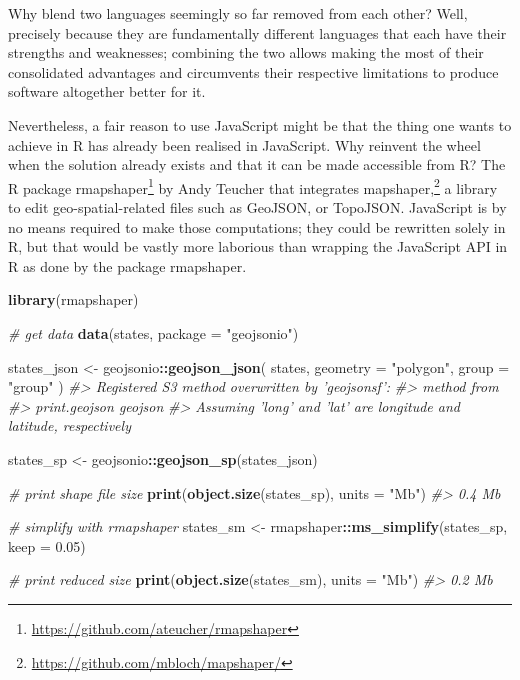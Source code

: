 \documentclass[10pt,]{krantz}
\makeatletter
\newenvironment{Shaded}{\begin{snugshade}}{\end{snugshade}}
\newcommand{\CommentTok}[1]{\textcolor[rgb]{0.37,0.37,0.37}{\textit{#1}}}
\newcommand{\DataTypeTok}[1]{\textcolor[rgb]{0.27,0.27,0.27}{#1}}
\newcommand{\FloatTok}[1]{\textcolor[rgb]{0.06,0.06,0.06}{#1}}
\newcommand{\KeywordTok}[1]{\textcolor[rgb]{0.27,0.27,0.27}{\textbf{#1}}}
\newcommand{\NormalTok}[1]{#1}
\newcommand{\OperatorTok}[1]{\textcolor[rgb]{0.43,0.43,0.43}{\textbf{#1}}}
\newcommand{\StringTok}[1]{\textcolor[rgb]{0.5,0.5,0.5}{#1}}
\renewcommand{\href}[2]{#2\footnote{\url{#1}}}
\newenvironment{kframe}{%
\medskip{}
\setlength{\fboxsep}{.8em}
 \def\at@end@of@kframe{}%
 \ifinner\ifhmode%
  \def\at@end@of@kframe{\end{minipage}}%
  \begin{minipage}{\columnwidth}%
 \fi\fi%
 \def\FrameCommand##1{\hskip\@totalleftmargin \hskip-\fboxsep
 \colorbox{shadecolor}{##1}\hskip-\fboxsep
     \hskip-\linewidth \hskip-\@totalleftmargin \hskip\columnwidth}%
 \MakeFramed {\advance\hsize-\width
   \@totalleftmargin\z@ \linewidth\hsize
   \@setminipage}}%
 {\par\unskip\endMakeFramed%
 \at@end@of@kframe}
\renewenvironment{Shaded}{\begin{kframe}}{\end{kframe}}
\makeatother
\begin{document}
Why blend two languages seemingly so far removed from each other? Well, precisely because they are fundamentally different languages that each have their strengths and weaknesses; combining the two allows making the most of their consolidated advantages and circumvents their respective limitations to produce software altogether better for it.

Nevertheless, a fair reason to use JavaScript might be that the thing one wants to achieve in R has already been realised in JavaScript. Why reinvent the wheel when the solution already exists and that it can be made accessible from R? The R package \href{https://github.com/ateucher/rmapshaper}{rmapshaper} \citep{R-rmapshaper} by Andy Teucher that integrates \href{https://github.com/mbloch/mapshaper/}{mapshaper,} a library to edit geo-spatial-related files such as GeoJSON, or TopoJSON. JavaScript is by no means required to make those computations; they could be rewritten solely in R, but that would be vastly more laborious than wrapping the JavaScript API in R as done by the package rmapshaper.

\begin{Shaded}
\begin{Highlighting}[]
\KeywordTok{library}\NormalTok{(rmapshaper)}

\CommentTok{# get data}
\KeywordTok{data}\NormalTok{(states, }\DataTypeTok{package =} \StringTok{"geojsonio"}\NormalTok{)}

\NormalTok{states_json <-}\StringTok{ }\NormalTok{geojsonio}\OperatorTok{::}\KeywordTok{geojson_json}\NormalTok{(}
\NormalTok{  states, }
  \DataTypeTok{geometry =} \StringTok{"polygon"}\NormalTok{, }
  \DataTypeTok{group =} \StringTok{"group"}
\NormalTok{)}
\CommentTok{#> Registered S3 method overwritten by 'geojsonsf':}
\CommentTok{#>   method        from   }
\CommentTok{#>   print.geojson geojson}
\CommentTok{#> Assuming 'long' and 'lat' are longitude and latitude, respectively}

\NormalTok{states_sp <-}\StringTok{ }\NormalTok{geojsonio}\OperatorTok{::}\KeywordTok{geojson_sp}\NormalTok{(states_json)}

\CommentTok{# print shape file size}
\KeywordTok{print}\NormalTok{(}\KeywordTok{object.size}\NormalTok{(states_sp), }\DataTypeTok{units =} \StringTok{"Mb"}\NormalTok{)}
\CommentTok{#> 0.4 Mb}

\CommentTok{# simplify with rmapshaper}
\NormalTok{states_sm <-}\StringTok{ }\NormalTok{rmapshaper}\OperatorTok{::}\KeywordTok{ms_simplify}\NormalTok{(states_sp, }\DataTypeTok{keep =} \FloatTok{0.05}\NormalTok{)}

\CommentTok{# print reduced size}
\KeywordTok{print}\NormalTok{(}\KeywordTok{object.size}\NormalTok{(states_sm), }\DataTypeTok{units =} \StringTok{"Mb"}\NormalTok{)}
\CommentTok{#> 0.2 Mb}
\end{Highlighting}
\end{Shaded}
\end{document}
